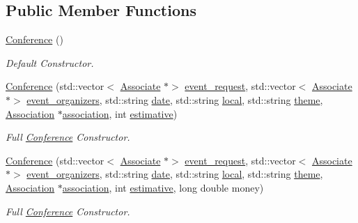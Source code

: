 \subsection*{Public Member Functions}
\begin{DoxyCompactItemize}
\item 
\hyperlink{classConference_a433a85d640693398c2c96a2a655fc6f4}{Conference} ()
\begin{DoxyCompactList}\small\item\em Default Constructor. \end{DoxyCompactList}\item 
\hyperlink{classConference_a23b9a4644d1608f8f33400a6e41b32df}{Conference} (std\+::vector$<$ \hyperlink{classAssociate}{Associate} $\ast$$>$ \hyperlink{classEvent_a6cec387dca85f0a0e8419cfc94eb320e}{event\+\_\+request}, std\+::vector$<$ \hyperlink{classAssociate}{Associate} $\ast$$>$ \hyperlink{classEvent_ad35e04c759fdbfad75aed0b6e2eef63c}{event\+\_\+organizers}, std\+::string \hyperlink{classEvent_a9a93c9d38211f84cd6e347690e177f11}{date}, std\+::string \hyperlink{classEvent_a3d1f28a3bde9ab718d5b0003f8ab5129}{local}, std\+::string \hyperlink{classEvent_aa9cc4378d5cecaadc8e6de92b313e6f8}{theme}, \hyperlink{classAssociation}{Association} $\ast$\hyperlink{classEvent_a3c8694833e50dbd2e37943eff1f5c9b1}{association}, int \hyperlink{classConference_ab3acc9b9aec3a4dbcfd18d1611337ecb}{estimative})
\begin{DoxyCompactList}\small\item\em Full \hyperlink{classConference}{Conference} Constructor. \end{DoxyCompactList}\item 
\hyperlink{classConference_ac86f5bff0837b92bccad09241a80137c}{Conference} (std\+::vector$<$ \hyperlink{classAssociate}{Associate} $\ast$$>$ \hyperlink{classEvent_a6cec387dca85f0a0e8419cfc94eb320e}{event\+\_\+request}, std\+::vector$<$ \hyperlink{classAssociate}{Associate} $\ast$$>$ \hyperlink{classEvent_ad35e04c759fdbfad75aed0b6e2eef63c}{event\+\_\+organizers}, std\+::string \hyperlink{classEvent_a9a93c9d38211f84cd6e347690e177f11}{date}, std\+::string \hyperlink{classEvent_a3d1f28a3bde9ab718d5b0003f8ab5129}{local}, std\+::string \hyperlink{classEvent_aa9cc4378d5cecaadc8e6de92b313e6f8}{theme}, \hyperlink{classAssociation}{Association} $\ast$\hyperlink{classEvent_a3c8694833e50dbd2e37943eff1f5c9b1}{association}, int \hyperlink{classConference_ab3acc9b9aec3a4dbcfd18d1611337ecb}{estimative}, long double money)
\begin{DoxyCompactList}\small\item\em Full \hyperlink{classConference}{Conference} Constructor. \end{DoxyCompactList}\item 

\end{DoxyCompactItemize}
